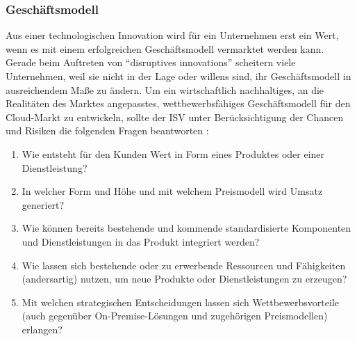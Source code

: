 \subsubsection{Geschäftsmodell}
Aus einer technologischen Innovation wird für ein Unternehmen erst ein Wert, 
wenn es mit einem erfolgreichen Geschäftsmodell vermarktet werden kann. Gerade 
beim Auftreten von "`disruptives innovations"' scheitern viele Unternehmen, 
weil sie nicht in der Lage oder willens sind, ihr Geschäftsmodell in 
ausreichendem Maße zu 
ändern.  Um ein 
wirtschaftlich nachhaltiges, an die Realitäten des Marktes angepasstes, 
wettbewerbsfähiges Geschäftsmodell für den Cloud-Markt zu entwickeln, sollte 
der ISV unter Berücksichtigung der Chancen und Risiken die folgenden Fragen 
beantworten :
\begin{enumerate}
	\item Wie entsteht für den Kunden Wert in Form eines Produktes oder 
		einer Dienstleistung?
	\item In welcher Form und Höhe und mit welchem Preismodell wird Umsatz 
generiert? 
	\item Wie können bereits bestehende und kommende standardisierte 
Komponenten und Dienstleistungen in das Produkt integriert werden?
	\item Wie lassen sich bestehende oder zu erwerbende Ressourcen und 
Fähigkeiten (andersartig) nutzen, um neue Produkte oder Dienstleistungen zu 
erzeugen?
	\item Mit welchen strategischen Entscheidungen lassen sich 
Wettbewerbsvorteile (auch gegenüber On-Premise-Lösungen und 
zugehörigen Preismodellen) erlangen?
\end{enumerate}

